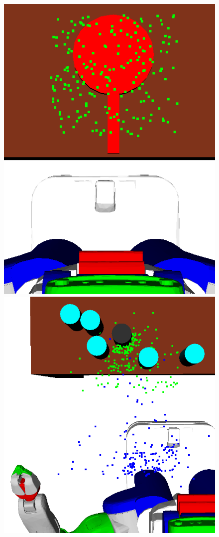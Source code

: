 \begin{figure}[t]
    \includegraphics[scale=0.13]{images/frying_initial.png}\vspace{1em}
    \includegraphics[scale=0.112]{images/learn12.png}

\end{figure}
